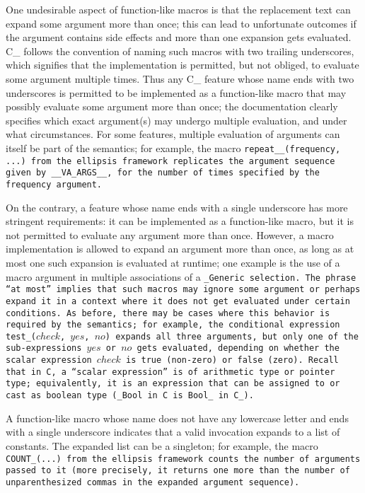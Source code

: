 One undesirable aspect of function-like macros is that the
replacement text can expand some argument more than once;
this can lead to unfortunate outcomes if the argument contains
side effects and more than one expansion gets evaluated.
C\_ follows the convention of naming such macros with two trailing underscores,
which signifies that the implementation is permitted,
but not obliged, to evaluate some argument multiple times.
Thus any C\_ feature whose name ends with two underscores is permitted to be
implemented as a function-like macro that may possibly evaluate some
argument more than once; the documentation clearly specifies which exact
argument(s) may undergo multiple evaluation, and under what circumstances.
For some features, multiple evaluation of arguments can itself be part of the
semantics; for example, the macro \tt{repeat__(frequency, ...)} from the
ellipsis framework replicates the argument sequence given by \tt{__VA_ARGS__},
for the number of times specified by the \tt{frequency} argument.

On the contrary, a feature whose name ends with a single underscore has
more stringent requirements: it can be implemented as a function-like macro,
but it is not permitted to evaluate any argument more than once.
However, a macro implementation is allowed to expand an argument more
than once, as long as at most one such expansion is evaluated at runtime;
one example is the use of a macro argument in
multiple associations of a \tt{_Generic} selection.
The phrase ``at most'' implies that such macros may ignore some argument or perhaps
expand it in a context where it does not get evaluated under certain conditions.
As before, there may be cases where this behavior is required by the semantics;
for example, the conditional expression \tt{test_(}$check$\tt{,} $yes$\tt{,}
$no$\tt{)} expands all three arguments, but only one of the
sub-expressions $yes$ or $no$ gets evaluated, depending on whether
the scalar expression $check$ is true (non-zero) or false (zero).
Recall that in C, a ``scalar expression'' is of arithmetic type or pointer type;
equivalently, it is an expression that can be assigned to or
cast as boolean type (\tt{_Bool} in C is \tt{Bool_} in C\_).

A function-like macro whose name does not have any
lowercase letter and ends with a single underscore
indicates that a valid invocation expands to a list of constants.
The expanded list can be a singleton; for example, the macro \tt{COUNT_(...)}
from the ellipsis framework counts the number of arguments passed to it
(more precisely, it returns one more than the number of
unparenthesized commas in the expanded argument sequence).

